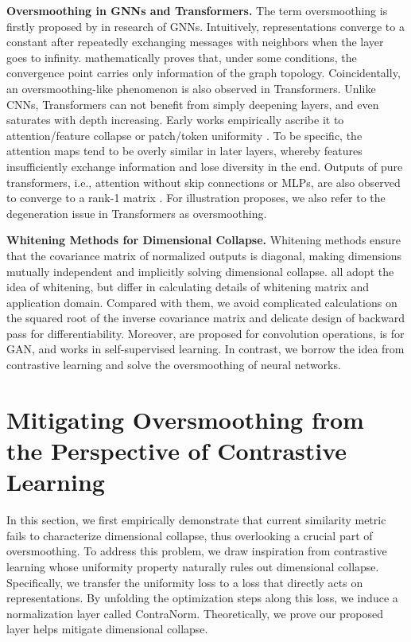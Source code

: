 \documentclass{article}
\theoremstyle{definition}
\theoremstyle{remark}
\theoremstyle{theorem}
\begin{document}
\textbf{Oversmoothing in GNNs and Transformers.} The term oversmoothing is firstly proposed by \citet{li2018deeper} in research of GNNs. Intuitively, representations converge to a constant after repeatedly exchanging messages with neighbors when the layer goes to infinity. \citet{zhou2020graph} mathematically proves that, under some conditions, the convergence point carries only information of the graph topology. Coincidentally, an oversmoothing-like phenomenon is also observed in Transformers. Unlike CNNs, Transformers can not benefit from simply deepening layers, and even saturates with depth increasing. Early works empirically ascribe it to attention/feature collapse or patch/token uniformity \citep{tang2021augmented, zhou2021deepvit, gong2021vision, yan2022addressing}. To be specific, the attention maps tend to be overly similar in later layers, whereby features insufficiently exchange information and lose diversity in the end. Outputs of pure transformers, i.e., attention without skip connections or MLPs, are also observed to converge to a rank-1 matrix \citep{dong2021attention}. For illustration proposes, we also refer to the degeneration issue in Transformers as oversmoothing. 

\textbf{Whitening Methods for Dimensional Collapse.} Whitening methods ensure that the covariance matrix of normalized outputs is diagonal, making dimensions mutually independent and implicitly solving dimensional collapse. \citet{huang2018decorrelated,huang2019iterative,siarohin2018whitening,ermolov2021whitening} all adopt the idea of whitening, but differ in calculating details of whitening matrix and application domain. Compared with them, we avoid complicated calculations on the squared root of the inverse covariance matrix and delicate design of backward pass for differentiability. Moreover, \citet{huang2018decorrelated,huang2019iterative} are proposed for convolution operations, \citet{siarohin2018whitening} is for GAN, and \citet{ermolov2021whitening} works in self-supervised learning. In contrast, we borrow the idea from contrastive learning and solve the oversmoothing of neural networks.



\section{Mitigating Oversmoothing from the Perspective of Contrastive Learning}

In this section, we first empirically demonstrate that current similarity metric fails to characterize dimensional collapse, thus overlooking a crucial part of oversmoothing. To address this problem, we draw inspiration from contrastive learning whose uniformity property naturally rules out dimensional collapse. Specifically, we transfer the uniformity loss to a loss that directly acts on representations. By unfolding the optimization steps along this loss, we induce a normalization layer called ContraNorm. Theoretically, we prove our proposed layer helps mitigate dimensional collapse.
\end{document}
